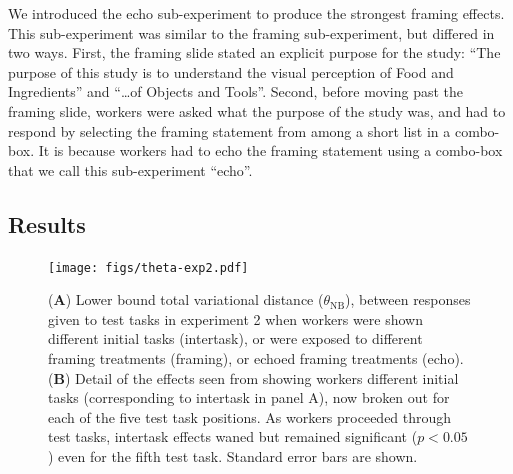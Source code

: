 \documentclass{sigchi}
\begin{document}
We introduced the echo sub-experiment to produce the strongest framing 
effects.  This sub-experiment was similar to the framing sub-experiment,
but differed in two ways.  First, the framing slide stated an explicit
purpose for the study: ``The purpose of this study is to understand the 
visual perception of Food and Ingredients'' 
and ``\ldots of Objects and Tools''.  Second, before moving past the
framing slide, workers were asked what the purpose of the study was, and
had to respond by selecting the framing statement from among a short
list in a combo-box.  It is because workers had to echo the framing 
statement using a combo-box that we call this sub-experiment ``echo''.

\subsection{Results}

\begin{figure}[t]
    \centering
	\texttt{[image: figs/theta-exp2.pdf]}
	\caption{
	    (\textbf{A}) Lower bound total variational distance 
		($\theta_\mathrm{NB}$), between 
		responses given to test tasks in experiment 2 
		when workers were shown different initial tasks (intertask), 
		or were exposed to different framing treatments (framing), or 
		echoed framing treatments (echo).
		(\textbf{B}) Detail of the effects seen from showing
		workers different initial tasks (corresponding to intertask in 
		panel A), now broken out for each of the five test task positions.
		As workers proceeded through test tasks, intertask effects waned
		but remained significant ($p<0.05$) even for the fifth test task.
		Standard error bars are shown.
	}
	\label{fig:theta}
\end{figure}
\end{document}
